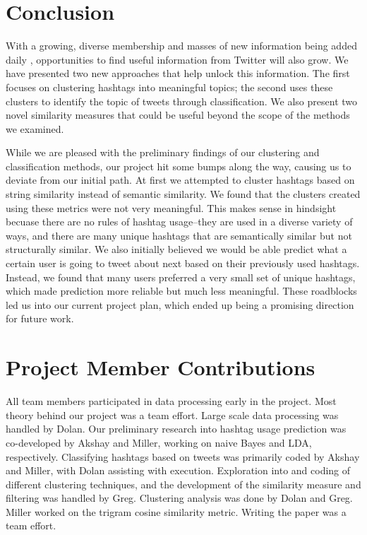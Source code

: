 \section{Conclusion}
With a growing, diverse membership and masses of new information being added daily \cite{Holt2011}, opportunities to find useful information from Twitter will also grow. We have presented two new approaches that help unlock this information. The first focuses on clustering hashtags into meaningful topics; the second uses these clusters to identify the topic of tweets through classification. We also present two novel similarity measures that could be useful beyond the scope of the methods we examined. 

While we are pleased with the preliminary findings of our clustering and classification methods, our project hit some bumps along the way, causing us to deviate from our initial path. At first we attempted to cluster hashtags based on string similarity instead of semantic similarity. We found that the clusters created using these metrics were not very meaningful. This makes sense in hindsight becuase there are no rules of hashtag usage--they are used in a diverse variety of ways, and there are many unique hashtags that are semantically similar but not structurally similar. We also initially believed we would be able predict what a certain user is going to tweet about next based on their previously used hashtags. Instead, we found that many users preferred a very small set of unique hashtags, which made prediction more reliable but much less meaningful. These roadblocks led us into our current project plan, which ended up being a promising direction for future work.


\section{Project Member Contributions}
All team members participated in data processing early in the project.  Most theory behind our project was a team effort.  Large scale data processing was handled by Dolan. Our preliminary research into hashtag usage prediction was co-developed by Akshay and Miller, working on naive Bayes and LDA, respectively.  Classifying hashtags based on tweets was primarily coded by Akshay and Miller, with Dolan assisting with execution. Exploration into and coding of different clustering techniques, and the development of the similarity measure and filtering was handled by Greg. Clustering analysis was done by Dolan and Greg. Miller worked on the trigram cosine similarity metric. Writing the paper was a team effort.